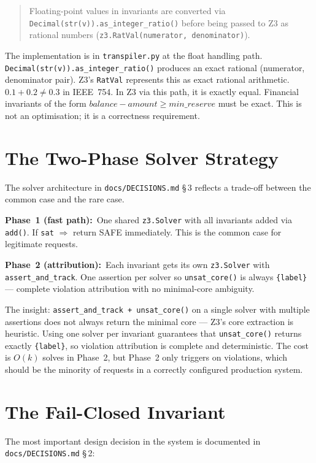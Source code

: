 \documentclass[12pt,a4paper,oneside]{report}
\newcommand{\fname}[1]{\texttt{#1}}          %
\newcommand{\code}[1]{\texttt{#1}}           %
\newcommand{\cfrsec}[1]{\S\,#1}             %
\begin{document}
\begin{quote}
Floating-point values in invariants are converted via
\code{Decimal(str(v)).as\_integer\_ratio()} before being passed to Z3 as
rational numbers (\code{z3.RatVal(numerator, denominator)}).
\end{quote}

The implementation is in \fname{transpiler.py} at the float handling path.
\code{Decimal(str(v)).as\_integer\_ratio()} produces an exact rational
(numerator, denominator pair). Z3's \code{RatVal} represents this as exact
rational arithmetic. $0.1 + 0.2 \neq 0.3$ in IEEE~754. In Z3 via this path,
it is exactly equal. Financial invariants of the form $\mathit{balance} -
\mathit{amount} \geq \mathit{min\_reserve}$ must be exact. This is not an
optimisation; it is a correctness requirement.

\section{The Two-Phase Solver Strategy}

The solver architecture in \fname{docs/DECISIONS.md} \cfrsec{3} reflects a
trade-off between the common case and the rare case.

\textbf{Phase~1 (fast path):}\ One shared \code{z3.Solver} with all
invariants added via \code{add()}. If \code{sat} $\Rightarrow$ return SAFE
immediately. This is the common case for legitimate requests.

\textbf{Phase~2 (attribution):}\ Each invariant gets its own \code{z3.Solver}
with \code{assert\_and\_track}. One assertion per solver so
\code{unsat\_core()} is always \code{\{label\}} --- complete violation
attribution with no minimal-core ambiguity.

The insight: \code{assert\_and\_track + unsat\_core()} on a single solver with
multiple assertions does not always return the minimal core --- Z3's core
extraction is heuristic. Using one solver per invariant guarantees that
\code{unsat\_core()} returns exactly \code{\{label\}}, so violation
attribution is complete and deterministic. The cost is $O(k)$ solves in
Phase~2, but Phase~2 only triggers on violations, which should be the minority
of requests in a correctly configured production system.

\section{The Fail-Closed Invariant}

The most important design decision in the system is documented in
\fname{docs/DECISIONS.md} \cfrsec{2}:
\end{document}
